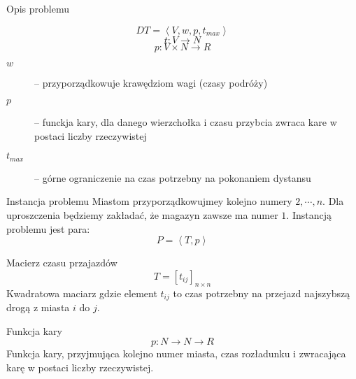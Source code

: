 \begin{frame}{Opis problemu}
	
	\begin{equation}
		DT = \left< V, w, p, t_{max}\right>
	\end{equation}
	\begin{equation}
		t : V \rightarrow N
	\end{equation}
	\begin{equation}
		p : V \times N \rightarrow R
	\end{equation}
	\begin{description}
		\item[$w$] -- przyporządkowuje krawędziom wagi (czasy podróży)
		\item[$p$] -- funckja kary, dla danego wierzchołka i czasu przybcia zwraca kare w postaci liczby rzeczywistej
		\item[$t_{max}$] -- górne ograniczenie na czas potrzebny na pokonaniem dystansu
	\end{description}

\end{frame}

\begin{frame}
	
	\begin{block}{Instancja problemu}
		Miastom przyporządkowujmey kolejno numery $2, \cdots, n$.
		Dla uproszczenia będziemy zakładać, że magazyn zawsze ma numer $1$.
		Instancją problemu jest para:
		\begin{equation}
			P = \left< T, p \right>
		\end{equation}
	\end{block}
	
	\begin{block}{Macierz czasu przajazdów}		
		\begin{equation}
			T = \left[ t_{ij} \right]_{n \times n} 
		\end{equation}
		Kwadratowa maciarz gdzie element $t_{ij}$ to czas potrzebny na przejazd najszybszą drogą z miasta $i$ do $j$.
	\end{block}
	
	\begin{block}{Funkcja kary}
		\begin{equation}
			p : N \rightarrow N \rightarrow R 
		\end{equation}
		Funkcja kary, przyjmująca kolejno numer miasta, czas rozładunku i zwracająca karę w postaci liczby rzeczywistej.
	\end{block}

\end{frame}

